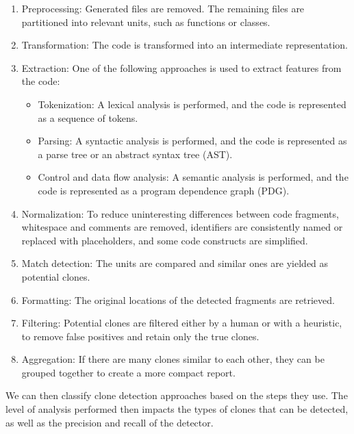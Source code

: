 \begin{enumerate}
\item Preprocessing: Generated files are removed. The remaining files are partitioned into relevant units, such as functions or classes.
\item Transformation: The code is transformed into an intermediate representation.
\item Extraction: One of the following approaches is used to extract features from the code:
  \begin{itemize}
    \item Tokenization: A lexical analysis is performed, and the code is represented as a sequence of tokens.
    \item Parsing: A syntactic analysis is performed, and the code is represented as a parse tree or an abstract syntax tree (AST).
    \item Control and data flow analysis: A semantic analysis is performed, and the code is represented as a program dependence graph (PDG).
  \end{itemize}
\item Normalization: To reduce uninteresting differences between code fragments, whitespace and comments are removed, identifiers are consistently named or replaced with placeholders, and some code constructs are simplified.
\item Match detection: The units are compared and similar ones are yielded as potential clones.
\item Formatting: The original locations of the detected fragments are retrieved.
\item Filtering: Potential clones are filtered either by a human or with a heuristic, to remove false positives and retain only the true clones.
\item Aggregation: If there are many clones similar to each other, they can be grouped together to create a more compact report.
\end{enumerate}

We can then classify clone detection approaches based on the steps they use.
The level of analysis performed then impacts the types of clones that can be detected, as well as the precision and recall of the detector.


